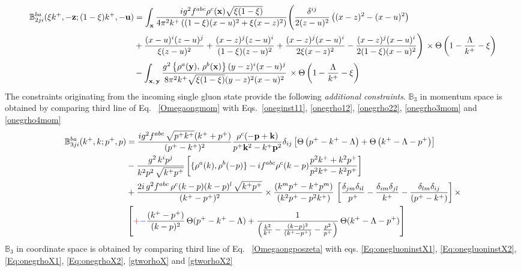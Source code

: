 \documentclass[10pt]{article}
\def\mf#1{\mathbb{#1}}
\def\v#1{\mathbf{#1}}
\numberwithin{equation}{section}
\begin{document}
\begin{align}
     \mf{B}^{ba}_{2ji}(\xi k^{+}, -\v{z}; (1-\xi)k^{+}, -\v{u}) & = \int_{\mathbf{x}}\frac{ig^{2}f^{abc}\rho^{c}(\mathbf{x})\sqrt{\xi(1-\xi)}}{4\pi^{2}k^{+}\left((1-\xi)(x-u)^{2}+\xi (x-z)^{2}\right)}\Bigg(\frac{\delta^{ij}}{2(z-u)^{2}}\left((x-z)^{2}-(x-u)^{2}\right)\notag \\ & +\frac{(x-u)^{i}(z-u)^{j}}{\xi (z-u)^{2}}+\frac{(x-z)^{j}(z-u)^{i}}{(1-\xi)(z-u)^{2}}+\frac{(x-z)^{j}(x-u)^{i}}{2\xi (x-z)^{2}} -\frac{(x-z)^{j}(x-u)^{i}}{2(1-\xi)(x-u)^{2}}\Bigg)\,\times\Theta\left(1-\frac{\Lambda}{k^{+}}-\xi\right)\notag \\ & -\int_{\mathbf{x},\,\mathbf{y}}\frac{g^{2}\left\{ \rho^{a}(\mathbf{y}),\,\rho^{b}(\mathbf{x})\right\} (y-z)^{i}(x-u)^{j}}{8\pi^{2}k^{+}\sqrt{\xi(1-\xi)}(y-z)^{2}(x-u)^{2}}\,\times\Theta\left(1-\frac{\Lambda}{k^{+}}-\xi\right)
\end{align}
The constraints originating from the incoming single gluon state provide the following {\it additional constraints}. $\mf{B}_{3}$ in momentum space is obtained by comparing third line of Eq.~ \eqref{Omegaongmom} with Eqs.~\eqref{oneginst11}, \eqref{onegrho12}, \eqref{onegrho22}, \eqref{onegrho3mom} and \eqref{onegrho4mom} 
\begin{align}
    \mf{B}^{ba}_{3ji}(k^{+},k; p^{+},p) & =  \frac{ig^2 f^{abc}\,\sqrt{p^{+}k^{+}} (k^++p^+) } {(p^+-k^+)^2} \frac{\rho^c(-\v{p}+\v{k})}{p^{+}\v{k}^2 - k^{+}\v{p}^2} \delta_{ij}\left[\Theta\left(p^{+} - k^{+} - \Lambda\right)+\Theta\left(k^{+}-\Lambda-p^{+}\right)\right]\notag \\ & -\frac{g^{2}\,k^{i}p^{j}}{k^{2}p^{2}\,\sqrt{k^{+}p^{+}}}\left[\{\rho^{a}(k),\rho^{b}(-p)\}-if^{abc}\rho^{c}(k-p)\frac{p^{2}k^{+}+k^{2}p^{+}}{p^{2}k^{+}-k^{2}p^{+}}\right]\notag \\ & +\frac{2i\,g^{2}f^{abc}\,\rho^{c}(k-p)(k-p)^{l}\,\sqrt{k^{+}p^{+}}}{(k^{+}-p^{+})^{2}}\times \frac{\left(k^{m}p^{+}-k^{+}p^{m}\right)}{\left(k^{2}p^{+}-p^{2}k^{+}\right)}\,\left[\frac{\delta_{jm}\delta_{il}}{p^{+}}-\frac{\delta_{im}\delta_{jl}}{k^{+}}-\frac{\delta_{lm}\delta_{ij}}{(p^{+}-k^{+})}\right]\times \notag \\ & \left[\textcolor{red}{+}\textcolor{blue}{-}\frac{(k^{+}-p^{+})}{(k-p)^{2}}\,\Theta(p^{+}-k^{+}-\Lambda)+\frac{1}{\left(\frac{k^{2}}{k^{+}}-\frac{(k-p)^{2}}{(k^{+}-p^{+})}-\frac{p^{2}}{p^{+}}\right)}\,\Theta(k^{+}-\Lambda-p^{+})\right]
\end{align}
$\mf{B}_{3}$ in coordinate space is obtained by comparing third line of Eq.~ \eqref{Omegaongposzeta} with eqs. \eqref{Eq:onegluoninstX1}, \eqref{Eq:onegluoninstX2}, \eqref{Eq:onegrhoX1}, \eqref{Eq:onegrhoX2}, \eqref{gtworhoX} and \eqref{gtworhoX2}
\end{document}

